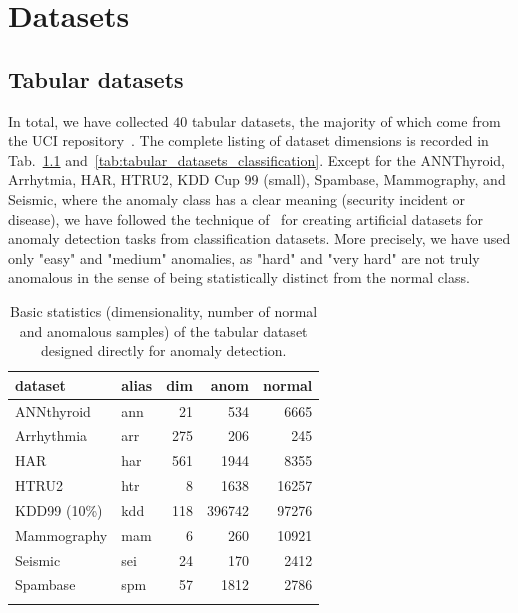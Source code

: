 \chapter{Datasets} \label{sec:appendix_datasets}

\section{Tabular datasets} \label{sec:tabular_datasets}
In total, we have collected $40$ tabular datasets, the majority of which come from the UCI repository~\cite{Dua:2019}. The complete listing of dataset dimensions is recorded in Tab.~\ref{tab:tabular_datasets_anomaly} and~\ref{tab:tabular_datasets_classification}. Except for the ANNThyroid, Arrhytmia, HAR, HTRU2, KDD Cup 99 (small), Spambase, Mammography, and Seismic, where the anomaly class has a clear meaning (security incident or disease), we have followed the technique of~\cite{emmott2013systematic} for creating artificial datasets for anomaly detection tasks from classification datasets. More precisely, we have used only "easy" and "medium" anomalies, as "hard" and "very hard" are not truly anomalous in the sense of being statistically distinct from the normal class.

\begin{table}
    \centering
    \tabcolsep=0.1cm
    \begin{tabular}{llrrr}
    \toprule
    \textbf{dataset} & \textbf{alias} & \textbf{dim} & \textbf{anom} & \textbf{normal}   \\\midrule
    ANNthyroid & ann  & 21 & 534 & 6665 \\
    Arrhythmia & arr  & 275 & 206 & 245 \\
    HAR & har & 561 & 1944 & 8355  \\
    HTRU2 & htr & 8 & 1638 & 16257  \\
    KDD99 (10\%) & kdd & 118 & 396742 & 97276  \\
    Mammography & mam & 6 & 260 & 10921  \\
    Seismic & sei  & 24 & 170 & 2412  \\
    Spambase & spm & 57 & 1812 & 2786  \\
    \\\bottomrule
    \end{tabular}
    \vspace*{0.15cm}
    \caption{Basic statistics (dimensionality, number of normal and anomalous samples) of the tabular dataset designed directly for anomaly detection.}
    \label{tab:tabular_datasets_anomaly}
\end{table}

